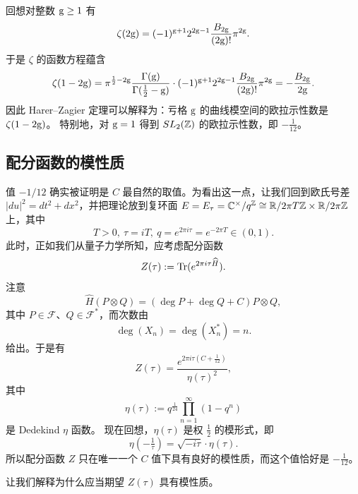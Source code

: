 \begin{remark} 回想对整数 ${\rm g}\ge 1$ 有
$$
\zeta(2{\rm g})=(-1)^{{\rm g}+1}2^{2{\rm g}-1}\frac{B_{2{\rm g}}}{(2{\rm g})!}\pi^{2{\rm g}}.
$$
于是 $\zeta$ 的函数方程蕴含
$$
\zeta(1-2{\rm g})=\pi^{\frac{1}{2}-2{\rm g}}\frac{\Gamma({\rm g})}{\Gamma(\frac{1}{2}-{\rm g})}\cdot (-1)^{{\rm g}+1}2^{2{\rm g}-1}\frac{B_{2{\rm g}}}{(2{\rm g})!}\pi^{2{\rm g}}=
-\frac{B_{2{\rm g}}}{2{\rm g}}.
$$
因此 Harer--Zagier 定理可以解释为：亏格 ${\rm g}$ 的曲线模空间的欧拉示性数是 $\zeta(1-2{\rm g})$。
特别地，对 ${\rm g}=1$ 得到 $SL_2(\Bbb Z)$ 的欧拉示性数，即 $-\frac{1}{12}$。
\end{remark} 


\subsection{配分函数的模性质} 
值 $-1/12$ 确实被证明是 $C$ 最自然的取值。为看出这一点，让我们回到欧氏号差 $|du|^2=dt^2+dx^2$，并把理论放到复环面 $E=E_\tau=\Bbb C^\times/q^{\Bbb Z}\cong \Bbb R/2\pi T\Bbb Z\times \Bbb R/2\pi \Bbb Z$ 上，其中
$$
T>0,\ \tau=iT,\ q=e^{2\pi i\tau}=e^{-2\pi T}\in (0,1).
$$
此时，正如我们从量子力学所知，应考虑配分函数
$$
Z(\tau):={\rm Tr}(e^{2\pi i\tau \widehat H}).
$$
注意
$$
\widehat H(P\otimes Q)=(\deg P+\deg Q+C)P\otimes Q,
$$
其中 $P\in \mathcal F$、$Q\in \mathcal F^*$，而次数由
$$
\deg(X_n)=\deg(X_n^*)=n.
$$ 
给出。于是有
$$
Z(\tau)=\frac{e^{2\pi i\tau(C+\frac{1}{12})}}{\eta(\tau)^2},
$$
其中
$$
\eta(\tau):=q^{\frac{1}{24}}\prod_{n=1}^{\infty}(1-q^n)
$$
是 Dedekind $\eta$ 函数。
现在回想，$\eta(\tau)$ 是权 $\frac{1}{2}$ 的模形式，即
$$
\eta(-\tfrac{1}{\tau})=\sqrt{-i\tau}\cdot\eta(\tau).
$$
所以配分函数 $Z$ 只在唯一一个 $C$ 值下具有良好的模性质，而这个值恰好是 $-\frac{1}{12}$。
 
让我们解释为什么应当期望 $Z(\tau)$ 具有模性质。

